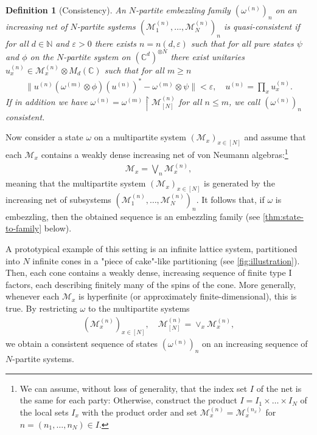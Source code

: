 \documentclass[a4paper, 10pt, onecolumn, accepted=2025-07-22]{quantumarticle}
\newtheorem{definition}[theorem]{Definition}
\theoremstyle{definition}
\newcommand{\norm}[1]{\lVert #1\rVert}
\newcommand{\ox}{\otimes}
\newcommand{\mc}{\mathcal}
\newcommand{\eps}{\varepsilon}
\newcommand{\up}[1]{^{(#1)}}
\def\CC{{\mathbb C}}
\def\M{{\mc M}}
\def\NN{{\mathbb N}}
\newcommand*{\1}{\text{\usefont{U}{bbold}{m}{n}1}}
\begin{document}
\begin{definition}[Consistency]
\label{def:consistent}
    An $N$-partite embezzling family $(\omega^{(n)})_n$ on an increasing net of $N$-partite systems $(\M_1^{(n)},\ldots,\M_N^{(n)})_n$ is \emph{quasi-consistent} if for all $d\in\NN$ and $\eps>0$ there exists $n = n(d,\eps)$ such that for all pure states $\psi$ and $\phi$ on the $N$-partite system on $(\CC^d)^{\otimes N}$ there exist unitaries $u^{(n)}_x \in \M^{(n)}_x\otimes M_{d}(\CC)$  such that for all $m\geq n$
  \begin{align}
      \norm{u^{(n)}(\omega^{(m)}\ox\phi)(u^{(n)})^* - \omega^{(m)} \ox \psi} < \eps,\quad u^{(n)} = \prod_x u_x^{(n)}.
  \end{align}
  If in addition we have $\omega^{(n)} = \omega^{(m)} \restriction \M^{(n)}_{[N]}$ for all $n\leq m$, we call $(\omega^{(n)})_n$ \emph{consistent}.
\end{definition}
Now consider a state $\omega$ on a multipartite system $(\M_x)_{x\in[N]}$ and assume that each $\M_x$ contains a weakly dense increasing net of von Neumann algebras:\footnote{We can assume, without loss of generality, that the index set $I$ of the net is the same for each party: Otherwise, construct the product $I=I_1\times \ldots\times I_N$ of the local sets $I_x$ with the product order and set $\M^{(n)}_x = \M^{(n_x)}_x$ for $n=(n_1,\ldots,n_N)\in I$. }
\begin{align}
    \M_x = \bigvee_n \M_x^{(n)},
\end{align}
meaning that the multipartite system $(\M_x)_{x\in[N]}$ is generated by  the increasing net of subsystems $(\M\up{n}_1,\ldots,\M\up{n}_N)_n$.
It follows that, if $\omega$ is embezzling, then the obtained sequence is an embezzling family (see \cref{thm:state-to-family} below).

A prototypical example of this setting is an infinite lattice system, partitioned into $N$ infinite cones in a "piece of cake"-like partitioning (see \cref{fig:illustration}). Then, each cone contains a weakly dense, increasing sequence of finite type I factors, each describing finitely many of the spins of the cone. More generally, whenever each $\M_x$ is hyperfinite (or approximately finite-dimensional), this is true.
By restricting $\omega$ to the multipartite systems
\begin{align}
    (\M^{(n)}_x)_{x\in[N]},\quad \M^{(n)}_{[N]} = \vee_x \M^{(n)}_x,
\end{align}
we obtain a consistent sequence of states $(\omega^{(n)})_n$ on an increasing sequence of $N$-partite systems.
\end{document}

